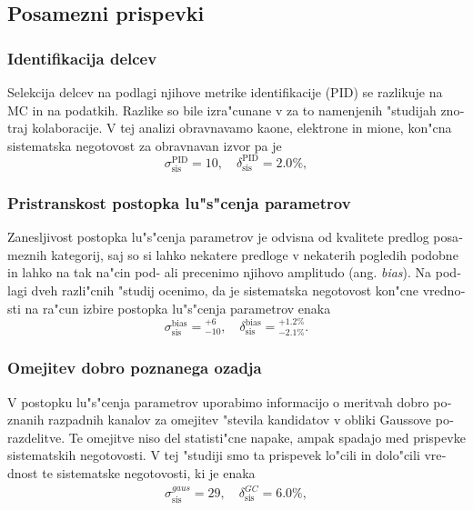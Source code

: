 \begin{otherlanguage}{slovene}
\subsection{Posamezni prispevki}

\subsubsection{Identifikacija delcev}
Selekcija delcev na podlagi njihove metrike identifikacije (PID) se razlikuje na MC in na podatkih. Razlike so bile izra"cunane v za to namenjenih "studijah znotraj kolaboracije. V tej analizi obravnavamo kaone, elektrone in mione, kon"cna sistematska negotovost za obravnavan izvor pa je
\begin{equation}
\sigma_{\mathrm{sis}}^{\mathrm{PID}} = 10,\quad \delta_{\mathrm{sis}}^{\mathrm{PID}} = 2.0\%,
\end{equation}

\subsubsection{Pristranskost postopka lu"s"cenja parametrov}
Zanesljivost postopka lu"s"cenja parametrov je odvisna od kvalitete predlog posameznih kategorij, saj so si lahko nekatere predloge v nekaterih pogledih podobne in lahko na tak na"cin pod- ali precenimo njihovo amplitudo (ang. \textit{bias}). Na podlagi dveh razli"cnih "studij ocenimo, da je sistematska negotovost kon"cne vrednosti na ra"cun izbire postopka lu"s"cenja parametrov enaka
\begin{equation}
\sigma_{\mathrm{sis}}^{\mathrm{bias}} = {}^{+6}_{-10},\quad \delta_{\mathrm{sis}}^{\mathrm{bias}} = {}^{+1.2\%}_{-2.1\%}.
\end{equation}

\subsubsection{Omejitev dobro poznanega ozadja}
V postopku lu"s"cenja parametrov uporabimo informacijo o meritvah dobro poznanih razpadnih kanalov za omejitev "stevila kandidatov v obliki Gaussove porazdelitve. Te omejitve niso del statisti"cne napake, ampak spadajo med prispevke sistematskih negotovosti. V tej "studiji smo ta prispevek lo"cili in dolo"cili vrednost te sistematske negotovosti, ki je enaka
\begin{align}
\sigma_{\mathrm{sis}}^{gaus} = 29,\quad \delta_{\mathrm{sis}}^{GC} = 6.0\%,
\end{align}


\end{otherlanguage}
